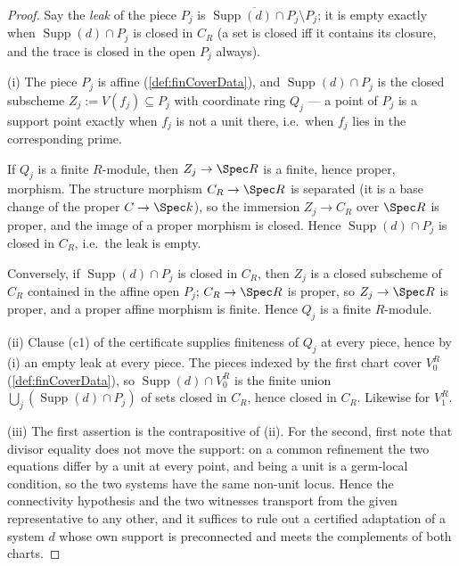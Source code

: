 \begin{proof}
  \leanok
  Say the \emph{leak} of the piece \(P_j\) is
  \(\overline{\operatorname{Supp}(d) \cap P_j} \setminus P_j\); it is empty exactly when
  \(\operatorname{Supp}(d) \cap P_j\) is closed in \(C_R\) (a set is closed iff it contains
  its closure, and the trace is closed in the open \(P_j\) always).

  (i) The piece \(P_j\) is affine (\ref{def:finCoverData}), and
  \(\operatorname{Supp}(d) \cap P_j\) is the closed subscheme \(Z_j := V(f_j) \subseteq
  P_j\) with coordinate ring \(Q_j\) --- a point of \(P_j\) is a support point exactly when
  \(f_j\) is not a unit there, i.e.\ when \(f_j\) lies in the corresponding prime.

  If \(Q_j\) is a finite \(R\)-module, then \(Z_j \to \Spec R\) is a finite, hence proper,
  morphism. The structure morphism \(C_R \to \Spec R\) is separated (it is a base change of
  the proper \(C \to \Spec k\)), so the immersion \(Z_j \to C_R\) over \(\Spec R\) is
  proper, and the image of a proper morphism is closed. Hence
  \(\operatorname{Supp}(d) \cap P_j\) is closed in \(C_R\), i.e.\ the leak is empty.

  Conversely, if \(\operatorname{Supp}(d) \cap P_j\) is closed in \(C_R\), then \(Z_j\) is a
  closed subscheme of \(C_R\) contained in the affine open \(P_j\); \(C_R \to \Spec R\) is
  proper, so \(Z_j \to \Spec R\) is proper, and a proper affine morphism is finite. Hence
  \(Q_j\) is a finite \(R\)-module.

  (ii) Clause (c1) of the certificate supplies finiteness of \(Q_j\) at every piece, hence
  by (i) an empty leak at every piece. The pieces indexed by the first chart cover
  \(V_0^R\) (\ref{def:finCoverData}), so \(\operatorname{Supp}(d) \cap V_0^R\) is the finite
  union \(\bigcup_j (\operatorname{Supp}(d) \cap P_j)\) of sets closed in \(C_R\), hence
  closed in \(C_R\). Likewise for \(V_1^R\).

  (iii) The first assertion is the contrapositive of (ii). For the second, first note that
  divisor equality does not move the support: on a common refinement the two equations
  differ by a unit at every point, and being a unit is a germ-local condition, so the two
  systems have the same non-unit locus. Hence the connectivity hypothesis and the two
  witnesses transport from the given representative to any other, and it suffices to rule
  out a certified adaptation of a system \(d\) whose own support is preconnected and meets
  the complements of both charts.


\end{proof}
